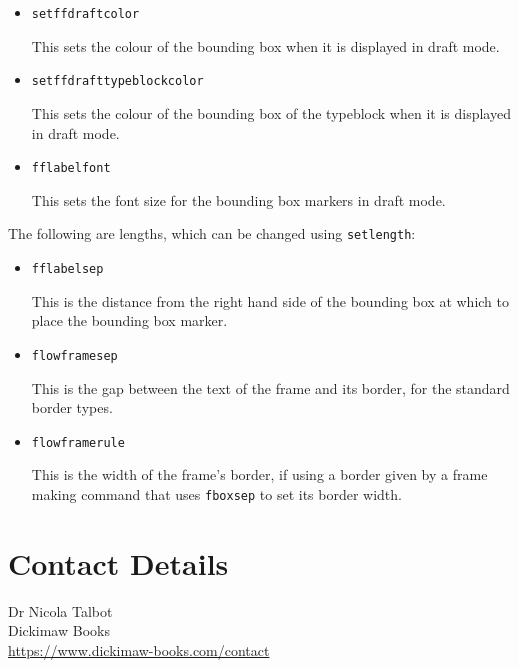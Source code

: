 \documentclass[a4paper,twoside]{book}
\newcommand{\cmdname}[1]{\texttt{\symbol{92}#1}}
\begin{document}
\begin{itemize}
\item \cmdname{setffdraftcolor} 

This sets the colour of the bounding box
when it is displayed in draft mode.

\item 
\cmdname{setffdrafttypeblockcolor} 

This sets the colour of
the bounding box of the typeblock when it is displayed
in draft mode.

\item \cmdname{fflabelfont}

This sets the font size for the bounding box markers in 
draft mode.

\end{itemize}

The following are lengths, which can be changed using
\cmdname{setlength}:

\begin{itemize}
\item \cmdname{fflabelsep}

This is the distance from the right hand side of the
bounding box at which to place the bounding box marker.

\item \cmdname{flowframesep}

This is the gap between the text of the frame and
its border, for the standard border types. 

\item \cmdname{flowframerule}

This is the width of the frame's border, if using
a border given by a frame making command that uses \cmdname{fboxsep}
to set its border width.
\end{itemize}


\chapter*{Contact Details}
\disablethumbtabs

Dr Nicola Talbot\\
Dickimaw Books\\
\url{https://www.dickimaw-books.com/contact}

\finishthispage\mbox{}%
\end{document}
